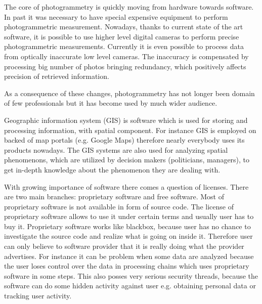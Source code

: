 \documentclass[a4paper,12pt]{article}
\begin{document}

The core of photogrammetry is quickly moving  from  hardware towards software. In past it was necessary to have special 
expensive equipment to perform photogrammetric measurement. Nowadays, thanks to current state of the art software, 
 it is possible to use higher level digital cameras to perform precise photogrammetric measurements. 
 Currently it is even possible to process data from optically inaccurate low level cameras.
 The inaccuracy is compensated by processing big number of photos bringing redundancy, 
 which positively affects precision of retrieved information.
 
As a consequence of these changes, photogrammetry has not longer been domain of few professionals but it has 
become used by much wider audience. 


Geographic information system (GIS) is software which is used for storing and processing information,
with spatial component. For instance  GIS is employed on backed of map portals (e.g. Google Maps) therefore nearly 
everybody uses its products nowadays. 
The GIS systems are also used for analyzing spatial phenomenons, which
are utilized by decision makers (politicians, managers), to get in-depth knowledge about the 
phenomenon they are dealing with.



With growing importance of software there comes a question of licenses. There are two 
main branches: proprietary software and free software. Most of proprietary software is not available in 
form of source code. The license of proprietary software allows to use it under certain terms and usually user 
has to buy it. Proprietary software works like blackbox, because user has no chance to investigate the source 
code and realize what is going on inside it. Therefore user can only believe to software provider
that it is really doing what the provider advertises. 
For instance it can be problem when some data are analyzed
because the user loses control 
over the data in processing chains which uses proprietary software in some steps.
This also posses very serious security threads, because the software can do some hidden activity against user
e.g. obtaining personal data or tracking user activity.
\end{document}
